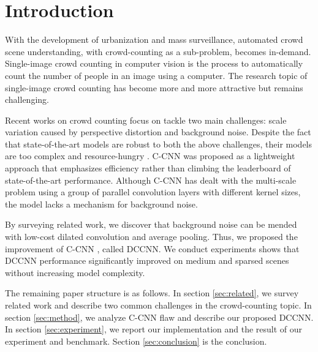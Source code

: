\section{Introduction}







With the development of urbanization and mass surveillance, automated crowd scene understanding, with crowd-counting as a sub-problem, becomes in-demand. Single-image crowd counting in computer vision is the process to automatically count the number of people in an image using a computer. The research topic of single-image crowd counting has become more and more attractive but remains challenging.


Recent works on crowd counting focus on tackle two main challenges: scale variation caused by perspective distortion and background noise. Despite the fact that state-of-the-art models are robust to both the above challenges, their models are too complex and resource-hungry \cite{liu2019context, jiang2019crowd, liu2019adcrowdnet, amirgholipour2020pdanet}. C-CNN \cite{9053780} was proposed as a lightweight approach that emphasizes efficiency rather than climbing the leaderboard of state-of-the-art performance. Although C-CNN \cite{9053780} has dealt with the multi-scale problem using a group of parallel convolution layers with different kernel sizes, the model lacks a mechanism for background noise. 


By surveying related work, we discover that background noise can be mended with low-cost dilated convolution and average pooling. Thus, we proposed the improvement of C-CNN \cite{9053780}, called DCCNN. We conduct experiments shows that DCCNN performance significantly improved on medium and sparsed scenes without increasing model complexity.

The remaining paper structure is as follows. In section \ref{sec:related}, we survey related work and describe two common challenges in the crowd-counting topic. In section \ref{sec:method}, we analyze C-CNN \cite{9053780} flaw and describe our proposed DCCNN. In section \ref{sec:experiment}, we report our implementation and the result of our experiment and benchmark. Section \ref{sec:conclusion} is the conclusion.

